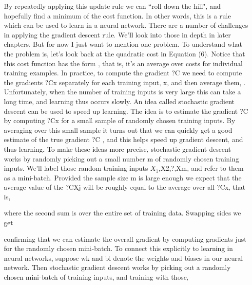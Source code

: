 By repeatedly applying this update rule we can ``roll down the hill", and hopefully find a minimum of the cost function. In other words, this is a rule which can be used to learn in a neural network.
There are a number of challenges in applying the gradient descent rule. We'll look into those in depth in later chapters. But for now I just want to mention one problem. To understand what the problem is, let's look back at the quadratic cost in Equation (6). Notice that this cost function has the form , that is, it's an average over costs  for individual training examples. In practice, to compute the gradient ?C we need to compute the gradients ?Cx separately for each training input, x, and then average them, . Unfortunately, when the number of training inputs is very large this can take a long time, and learning thus occurs slowly.
An idea called stochastic gradient descent can be used to speed up learning. The idea is to estimate the gradient ?C by computing ?Cx for a small sample of randomly chosen training inputs. By averaging over this small sample it turns out that we can quickly get a good estimate of the true gradient ?C , and this helps speed up gradient descent, and thus learning.
To make these ideas more precise, stochastic gradient descent works by randomly picking out a small number m of randomly chosen training inputs. We'll label those random training inputs $X_1$,X2,?,Xm, and refer to them as a mini-batch. Provided the sample size m is large enough we expect that the average value of the ?CXj will be roughly equal to the average over all ?Cx, that is, 

where the second sum is over the entire set of training data. Swapping sides we get 

confirming that we can estimate the overall gradient by computing gradients just for the randomly chosen mini-batch. 
To connect this explicitly to learning in neural networks, suppose wk and bl denote the weights and biases in our neural network. Then stochastic gradient descent works by picking out a randomly chosen mini-batch of training inputs, and training with those, 

